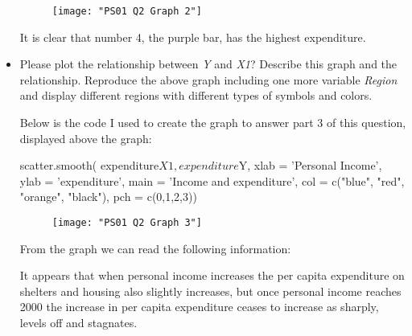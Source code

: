 \documentclass[12pt,letterpaper]{article}
\begin{document}
\begin{itemize}
\begin{figure}
	\centering
	\texttt{[image: "PS01 Q2 Graph 2"]}
	\caption{}
	\label{fig:ps01-q2-graph-2}
\end{figure}



It is clear that number 4, the purple bar, has the highest expenditure.


\item
Please plot the relationship between \emph{Y} and \emph{X1}? Describe this graph and the relationship. Reproduce the above graph including one more variable \emph{Region} and display different regions with different types of symbols and colors.

Below is the code I used to create the graph to answer part 3 of this question, displayed above the graph:


scatter.smooth( expenditure$X1, expenditure$Y, xlab = 'Personal Income', ylab = 'expenditure', main = 'Income and expenditure', col = c("blue", "red", "orange", "black"), pch = c(0,1,2,3))

\begin{figure}
	\centering
	\texttt{[image: "PS01 Q2 Graph 3"]}
	\caption{}
	\label{fig:ps01-q2-graph-3}
\end{figure}




From the graph we can read the following information: 

It appears that when personal income increases the per capita expenditure on shelters and housing also slightly increases, but once personal income reaches 2000 the increase in per capita expenditure ceases to increase as sharply, levels off and stagnates. 






\end{itemize}
\end{document}
